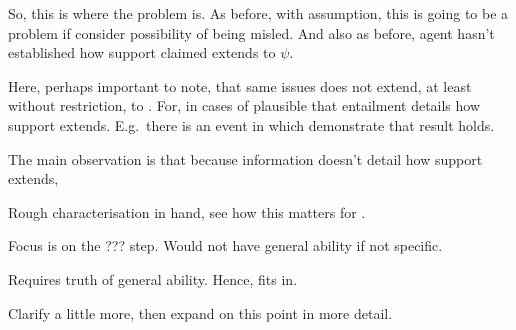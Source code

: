 \newpage


\begin{note}
  \color{red}
  So, this is where the problem is.
  As before, with assumption, this is going to be a problem if consider possibility of being misled.
  And also as before, agent hasn't established how support claimed extends to \(\psi\).

  Here, perhaps important to note, that same issues does not extend, at least without restriction, to \aben{}.
  For, in cases of \aben{} plausible that entailment details how support extends.
  E.g.\ there is an event in which demonstrate that result holds.

  The main observation is that because information doesn't detail how support extends, 
\end{note}



\begin{note}
  Rough characterisation in hand, see how this matters for \AR{}.

  Focus is on the ??? step.
  Would not have general ability if not specific.

  Requires truth of general ability.
  Hence, fits in.

  Clarify a little more, then expand on this point in more detail.
\end{note}


